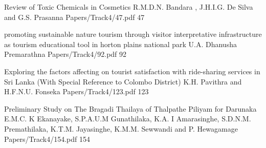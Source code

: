 

        \addpaper
    	{Review of Toxic Chemicals in Cosmetics}
   		 {R.M.D.N. Bandara , J.H.I.G. De Silva and G.S. Prasanna} 
   		 {Papers/Track4/47.pdf}
        {47}

        \addpaper
    	{promoting sustainable nature tourism through visitor interpretative infrastructure as tourism educational tool in horton plains national park}
   		 {U.A. Dhanusha Premarathna} 
   		 {Papers/Track4/92.pdf}
        {92}

        \addpaper
    	{Exploring the factors affecting on tourist satisfaction with ride-sharing services in Sri Lanka (With Special Reference to Colombo District)}
   		 {K.H. Pavithra and H.F.N.U. Fonseka} 
   		 {Papers/Track4/123.pdf}
        {123}



        \addpaper
    	{Preliminary Study on The Bragadi Thailaya of Thalpathe Piliyam for Darunaka}
   		 {E.M.C. K Ekanayake, S.P.A.U.M Gunathilaka, K.A. I Amarasinghe, S.D.N.M. Premathilaka, K.T.M. Jayasinghe, K.M.M. Sewwandi and P. Hewagamage} 
   		 {Papers/Track4/154.pdf}
        {154}